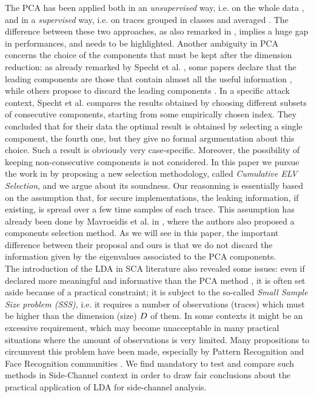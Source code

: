  The PCA has been applied both in an {\em unsupervised} way, i.e. on the whole data \cite{Batina2012,karsmakers2009side}, and in a {\em supervised} way, i.e. on traces grouped in classes and averaged \cite{TAprincipal,choudaryefficient,choudary2014efficient,disassembler,Standaert2008}. The difference between these two approaches, as also remarked in \cite{disassembler}, implies a huge gap in performances,  and needs to be highlighted. Another ambiguity in PCA concerns the choice of the components that must be kept after the dimension reduction: as already remarked by Specht et al.  \cite{specht}, some papers declare that the leading components are those that contain almost all the useful information \cite{TAprincipal}, while others propose to discard the leading components \cite{Batina2012}. In a specific attack context, Specht et al. compares the results obtained by choosing different subsets of consecutive components, starting from some empirically chosen index. They concluded that for their data the optimal result is obtained by selecting a single component, the fourth one, but they give no formal argumentation about this choice. Such a result is obviously very case-specific. Moreover, the possibility of keeping non-consecutive components is not considered. In this paper we pursue the work in \cite{specht} by proposing a new selection methodology, called {\em Cumulative ELV Selection}, and we argue about its soundness. Our reasonning is essentially based on the assumption that, for secure implementations, the leaking information, if existing, is spread over a few time samples of each trace. This assumption has already been done by Mavroeidis et al. in \cite{SCAclassProbl}, where the authors  also proposed a components selection method. As we will see in this paper, the important difference between their proposal and ours is that we do not discard the information given by the eigenvalues associated to the PCA components.  \\

The introduction of the LDA in SCA literature also revealed some issues: even if declared more meaningful and informative than the PCA method \cite{lessIsMore,Standaert2008}, it is often set aside because of a practical constraint; it is subject to the so-called {\em Small Sample Size problem (SSS)}, i.e. it requires a number of observations (traces) which must be higher than the dimension (size) $D$ of them. In some contexts it might be an excessive requirement, which may become unacceptable in many practical situations where the amount of observations is very limited. Many propositions to circumvent this problem have been made, especially by Pattern Recognition and Face Recognition communities \cite{eigenfaces,Chen2000,huang,Yu01adirect}. We find mandatory to test and compare such methods in Side-Channel context in order to draw fair conclusions about the practical application of LDA for side-channel analysis.\\

